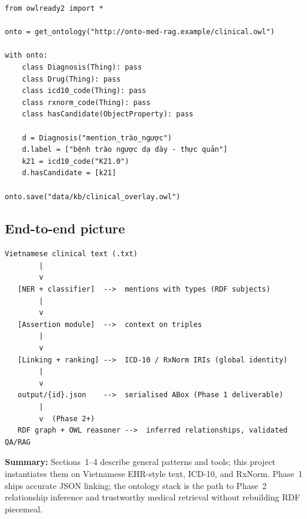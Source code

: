 \begin{small}
\begin{verbatim}
from owlready2 import *

onto = get_ontology("http://onto-med-rag.example/clinical.owl")

with onto:
    class Diagnosis(Thing): pass
    class Drug(Thing): pass
    class icd10_code(Thing): pass
    class rxnorm_code(Thing): pass
    class hasCandidate(ObjectProperty): pass

    d = Diagnosis("mention_trào_ngược")
    d.label = ["bệnh trào ngược dạ dày - thực quản"]
    k21 = icd10_code("K21.0")
    d.hasCandidate = [k21]

onto.save("data/kb/clinical_overlay.owl")
\end{verbatim}
\end{small}

\subsection{End-to-end picture}

\begin{small}
\begin{verbatim}
Vietnamese clinical text (.txt)
        |
        v
   [NER + classifier]  -->  mentions with types (RDF subjects)
        |
        v
   [Assertion module]  -->  context on triples
        |
        v
   [Linking + ranking] -->  ICD-10 / RxNorm IRIs (global identity)
        |
        v
   output/{id}.json    -->  serialised ABox (Phase 1 deliverable)
        |
        v  (Phase 2+)
   RDF graph + OWL reasoner -->  inferred relationships, validated QA/RAG
\end{verbatim}
\end{small}

\textbf{Summary:} Sections~1--4 describe general patterns and tools; this project
instantiates them on Vietnamese EHR-style text, ICD-10, and RxNorm. Phase~1 ships
accurate JSON linking; the ontology stack is the path to Phase~2 relationship
inference and trustworthy medical retrieval without rebuilding RDF piecemeal.
